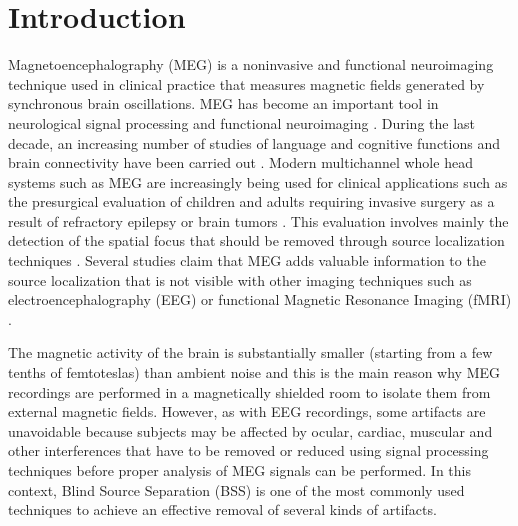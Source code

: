 \section{Introduction}

Magnetoencephalography (MEG) is a noninvasive and functional neuroimaging technique used in clinical practice that measures magnetic fields generated by synchronous brain oscillations. MEG has become an important tool in neurological signal processing and functional neuroimaging \citep{Hall2014,Baillet2001}. During the last decade, an increasing number of studies of language and cognitive functions and brain connectivity have been carried out \citep{Hari2012,Sakkalis2011}. Modern multichannel whole head systems such as MEG are increasingly being used for clinical applications such as the presurgical evaluation of children and adults requiring invasive surgery as a result of refractory epilepsy or brain tumors \citep{Stufflebeam2009}. This evaluation involves mainly the detection of the spatial focus that should be removed through source localization techniques \citep{Stefan2011}. Several studies claim that MEG adds valuable information to the source localization that is not visible with other imaging techniques such as electroencephalography (EEG) or functional Magnetic Resonance Imaging (fMRI) \citep{Stefan2011,Barkley2004,Sharon2007}.

The magnetic activity of the brain is substantially smaller (starting from a few tenths of femtoteslas) than ambient noise and this is the main reason why MEG recordings are performed in a magnetically shielded room to isolate them from external magnetic fields. However, as with EEG recordings, some artifacts are unavoidable because subjects may be affected by ocular, cardiac, muscular and other interferences \citep{Stufflebeam2009} that have to be removed or reduced using signal processing techniques before proper analysis of MEG signals can be performed. In this context, Blind Source Separation (BSS) is one of the most commonly used techniques to achieve an effective removal of several kinds of artifacts.

